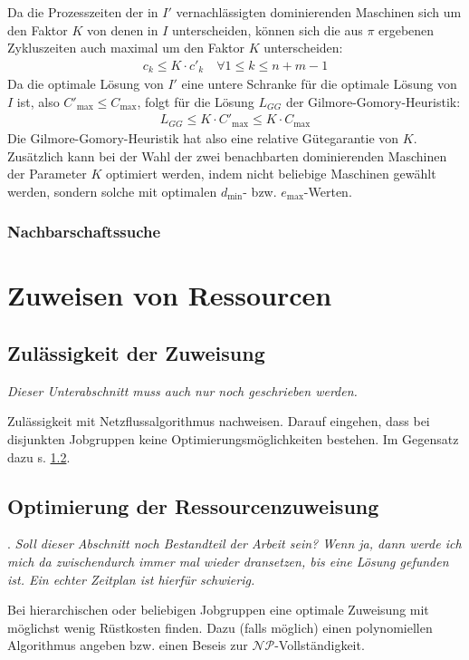 \documentclass{scrreprt}
\begin{document}
Da die Prozesszeiten der in $I'$ vernachlässigten dominierenden Maschinen sich um den Faktor $K$ von denen in $I$ unterscheiden, 
können sich die aus $\pi$ ergebenen Zykluszeiten auch maximal um den Faktor $K$ unterscheiden:
\begin{align}
    c_k \leq K\cdot c'_k \quad \forall 1\leq k\leq n+m-1
\end{align}
Da die optimale Lösung von $I'$ eine untere Schranke für die optimale Lösung von $I$ ist, also $C'_{\max} \leq C_{\max}$, folgt für die Lösung $L_{GG}$ der
Gilmore-Gomory-Heuristik:
\begin{align}
    L_{GG} \leq K\cdot C'_{\max} \leq K\cdot C_{\max}
\end{align}
Die Gilmore-Gomory-Heuristik hat also eine relative Gütegarantie von $K$.
Zusätzlich kann bei der Wahl der zwei benachbarten dominierenden Maschinen der Parameter $K$ optimiert werden, indem nicht beliebige Maschinen gewählt werden,
sondern solche mit optimalen $d_{\min}$- bzw. $e_{\max}$-Werten.

\subsubsection{Nachbarschaftssuche}


\section{Zuweisen von Ressourcen}
\label{sec:ZuweisungVonRessourcen}
\subsection{Zulässigkeit der Zuweisung}
\textit{Dieser Unterabschnitt muss auch nur noch geschrieben werden.}

Zulässigkeit mit Netzflussalgorithmus nachweisen.
Darauf eingehen, dass bei disjunkten Jobgruppen keine Optimierungsmöglichkeiten bestehen.
Im Gegensatz dazu s. \ref{subsec:optres}.


\subsection{Optimierung der Ressourcenzuweisung}
\label{subsec:optres}.
\textit{Soll dieser Abschnitt noch Bestandteil der Arbeit sein? Wenn ja, dann werde ich mich da zwischendurch immer mal wieder dransetzen,
bis eine Lösung gefunden ist. Ein echter Zeitplan ist hierfür schwierig.}

Bei hierarchischen oder beliebigen Jobgruppen eine optimale Zuweisung mit möglichst wenig Rüstkosten finden.
Dazu (falls möglich) einen polynomiellen Algorithmus angeben bzw. einen Beseis zur $\mathcal{NP}$-Vollständigkeit.
\end{document}
